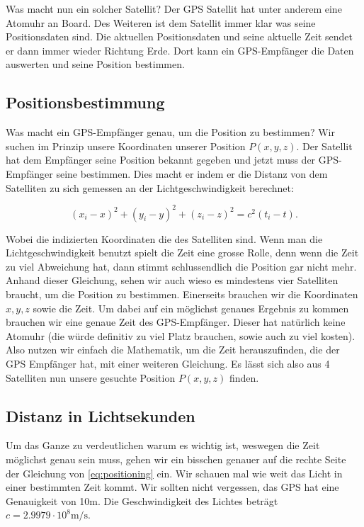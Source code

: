 \begin{refsection}
Was macht nun ein solcher Satellit? Der GPS Satellit hat unter anderem eine Atomuhr an Board. Des Weiteren ist dem Satellit immer klar was seine Positionsdaten sind. Die aktuellen Positionsdaten und seine aktuelle Zeit sendet er dann immer wieder Richtung Erde. Dort kann ein GPS-Empfänger die Daten auswerten und seine Position bestimmen.

\subsection{Positionsbestimmung}
Was macht ein GPS-Empfänger genau, um die Position zu bestimmen? Wir suchen im Prinzip unsere Koordinaten unserer Position $P(x,y,z)$. Der Satellit hat dem Empfänger seine Position bekannt gegeben und jetzt muss der GPS-Empfänger seine bestimmen. Dies macht er indem er die Distanz von dem Satelliten zu sich gemessen an der Lichtgeschwindigkeit berechnet:

\begin{equation}
\label{eq:positioning}
    (x_i-x)^2 + (y_i-y)^2 + (z_i-z)^2 = c^2 (t_i -t).
\end{equation}

\noindent{}Wobei die indizierten Koordinaten die des Satelliten sind. Wenn man die Lichtgeschwindigkeit benutzt spielt die Zeit eine grosse Rolle, denn wenn die Zeit zu viel Abweichung hat, dann stimmt schlussendlich die Position gar nicht mehr. Anhand dieser Gleichung, sehen wir auch wieso es mindestens vier Satelliten braucht, um die Position zu bestimmen. Einerseits brauchen wir die Koordinaten $x,y,z$ sowie die Zeit. Um dabei auf ein möglichst genaues Ergebnis zu kommen brauchen wir eine genaue Zeit des GPS-Empfänger. Dieser hat natürlich keine Atomuhr (die würde definitiv zu viel Platz brauchen, sowie auch zu viel kosten). Also nutzen wir einfach die Mathematik, um die Zeit herauszufinden, die der GPS Empfänger hat, mit einer weiteren Gleichung. Es lässt sich also aus 4 Satelliten nun unsere gesuchte Position $P(x,y,z)$ finden. 

\subsection{Distanz in Lichtsekunden}
Um das Ganze zu verdeutlichen warum es wichtig ist, weswegen die Zeit möglichst genau sein muss, gehen wir ein bisschen genauer auf die rechte Seite der Gleichung von \ref{eq:positioning} ein. Wir schauen mal wie weit das Licht in einer bestimmten Zeit kommt. Wir sollten nicht vergessen, das GPS hat eine Genauigkeit von 10m. Die Geschwindigkeit des Lichtes beträgt  \(c = 2.9979 \cdot 10^8 \text{m/s}\). \\


\end{refsection}
